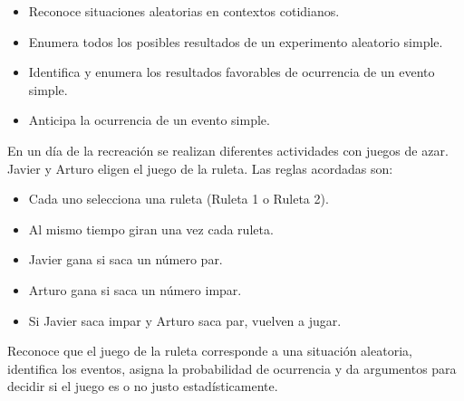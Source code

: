 \begin{itemize}
  \item Reconoce situaciones aleatorias en contextos cotidianos.
  \item Enumera todos los posibles resultados de un experimento aleatorio simple.
  \item Identifica y enumera los resultados favorables de ocurrencia de un evento simple.
  \item Anticipa la ocurrencia de un evento simple.
\end{itemize}

\ejemplo

En un día de la recreación se realizan diferentes actividades con juegos de azar. Javier y Arturo eligen el juego de la ruleta. Las reglas acordadas son:

\begin{itemize}
  \item Cada uno selecciona una ruleta (Ruleta 1 o Ruleta 2).
  \item Al mismo tiempo giran una vez cada ruleta.
  \item Javier gana si saca un número par.
  \item Arturo gana si saca un número impar.
  \item Si Javier saca impar y Arturo saca par, vuelven a jugar.
\end{itemize}


Reconoce que el juego de la ruleta corresponde a una situación aleatoria, identifica los eventos, asigna la probabilidad de ocurrencia y da argumentos para decidir si el juego es o no justo estadísticamente.



